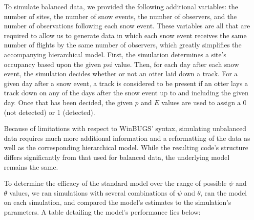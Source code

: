 \documentclass[12pt]{article}
\begin{document}
    To simulate balanced data, we provided the following additional variables:
    the number of sites, the number of snow events, the number of observers, and
    the number of observations following each snow event. These variables are
    all that are required to allow us to generate data in which each snow event
    receives the same number of flights by the same number of observers, which
    greatly simplifies the accompanying hierarchical model. First, the
    simulation determines a site's occupancy based upon the given \(psi\) value.
    Then, for each day after each snow event, the simulation decides whether or
    not an otter laid down a track. For a given day after a snow event, a track
    is considered to be present if an otter lays a track down on any of the days
    after the snow event up to and including the given day.  Once that has been
    decided, the given \(p\) and \(E\) values are used to assign a 0 (not
    detected) or 1 (detected).

    Because of limitations with respect to WinBUGS' syntax, simulating
    unbalanced data requires much more additional information and a reformatting
    of the data as well as the corresponding hierarchical model. While the
    resulting code's structure differs significantly from that used for balanced
    data, the underlying model remains the same.

    To determine the efficacy of the standard model over the range of possible
    \(\psi\) and \(\theta\) values, we ran simulations with several combinations
    of \(\psi\) and \(\theta\), ran the model on each simulation, and compared
    the model's estimates to the simulation's parameters. A table detailing the
    model's performance lies below:
\end{document}
